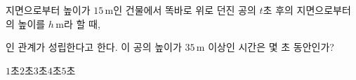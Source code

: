 지면으로부터 높이가 $15\,\mathrm{m}$인 건물에서 똑바로 위로 던진 공의 $t$초 후의 지면으로부터의 높이를 $h\,\mathrm{m}$라 할 때,\par\smallskip{}\par\smallskip\noindent 인 관계가 성립한다고 한다. 이 공의 높이가 $35\,\mathrm{m}$ 이상인 시간은 몇 초 동안인가?
\begin{choices32}{$1$초}{$2$초}{$3$초}{$4$초}{$5$초}\end{choices32}
